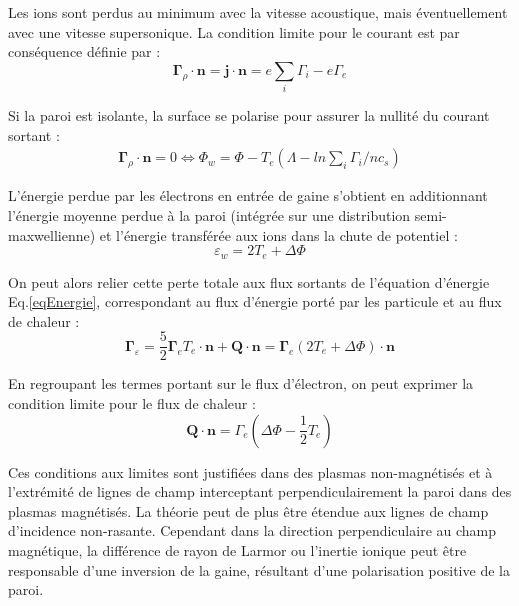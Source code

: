 Les ions sont perdus au minimum avec la vitesse acoustique, mais
éventuellement avec une vitesse supersonique. La condition limite pour le
courant est par conséquence définie par :
\begin{equation}
\boldsymbol{\Gamma}_\rho\cdot\mathbf{n}=\mathbf{j}\cdot\mathbf{n}=e\sum_i{\Gamma}_i-e{\Gamma}_e
\end{equation}

Si la paroi est isolante, la surface se polarise pour assurer la nullité du
courant sortant :
\begin{equation}\begin{split}
\boldsymbol{\Gamma}_\rho\cdot\mathbf{n}=0\Leftrightarrow
\Phi_w=\Phi-T_e(\Lambda-ln\sum_i\Gamma_i/nc_s)
\end{split}\end{equation}

L'énergie perdue par les électrons en entrée de gaine s'obtient en
additionnant l'énergie moyenne perdue à la paroi (intégrée sur une distribution
semi-maxwellienne) et l'énergie transférée aux ions dans la chute de potentiel :
\begin{equation}
	\varepsilon_w=2T_e+\Delta \Phi
\end{equation}
 
 On peut alors relier cette perte totale aux flux sortants de l'équation
 d'énergie Eq.\ref{eqEnergie}, correspondant au flux d'énergie porté par les
 particule et au flux de chaleur :
\begin{equation}
\boldsymbol{\Gamma}_\varepsilon=\frac{5}{2}\boldsymbol{\Gamma}_eT_e\cdot\mathbf{n}+\mathbf{Q}\cdot\mathbf{n}=
\boldsymbol{\Gamma}_e\left(2T_e+\Delta\Phi\right)\cdot\mathbf{n}
\end{equation}

En regroupant les termes portant sur le flux d'électron, on peut exprimer la
condition limite pour le flux de chaleur :
\begin{equation}
\mathbf{Q}\cdot\mathbf{n}=\Gamma_e\left(\Delta\Phi-\frac{1}{2}T_e\right)
\end{equation}

Ces conditions aux limites sont justifiées dans des plasmas non-magnétisés et à
l'extrémité de lignes de champ interceptant perpendiculairement la paroi dans
des plasmas magnétisés. La théorie peut de plus être étendue aux lignes de champ
d'incidence non-rasante. Cependant dans la direction perpendiculaire au champ
magnétique, la différence de rayon de Larmor ou l'inertie ionique peut être
responsable d'une inversion de la gaine, résultant d'une polarisation positive
de la paroi.

